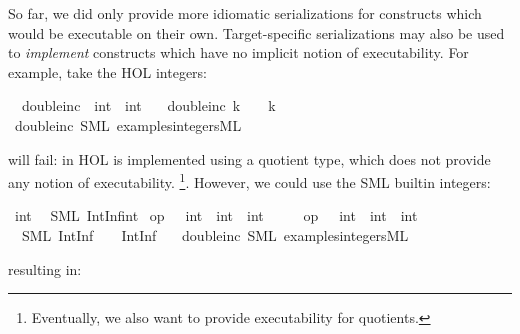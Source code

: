 \begin{isabellebody}
\begin{isamarkuptext}
  So far, we did only provide more idiomatic serializations for
  constructs which would be executable on their own.  Target-specific
  serializations may also be used to \emph{implement} constructs
  which have no implicit notion of executability.  For example,
  take the HOL integers:%
\end{isamarkuptext}%
\isamarkuptrue%
\isamarkupfalse%
\isanewline
\ \ double{\isacharunderscore}inc\ {\isacharcolon}{\isacharcolon}\ {\isachardoublequoteopen}int\ {\isasymRightarrow}\ int{\isachardoublequoteclose}\ \isanewline
\ \ {\isachardoublequoteopen}double{\isacharunderscore}inc\ k\ {\isacharequal}\ {}\ {\isacharasterisk}\ k\ {\isacharplus}\ {}{\isachardoublequoteclose}\isanewline
\isanewline
{}\isamarkupfalse%
\ double{\isacharunderscore}inc\ {\isacharparenleft}SML\ {\isachardoublequoteopen}examples{\isacharslash}integers{\isachardot}ML{\isachardoublequoteclose}{\isacharparenright}%
\begin{isamarkuptext}%
will fail:  in HOL is implemented using a quotient
  type, which does not provide any notion of executability.
  \footnote{Eventually, we also want to provide executability
  for quotients.}.  However, we could use the SML builtin
  integers:%
\end{isamarkuptext}%
\isamarkuptrue%
%
\isadelimtt
%
\endisadelimtt
%
\isatagtt
{}\isamarkupfalse%
\ int\isanewline
\ \ {\isacharparenleft}SML\ {\isachardoublequoteopen}IntInf{\isachardot}int{\isachardoublequoteclose}{\isacharparenright}\isanewline
\isanewline
{}\isamarkupfalse%
\ {\isachardoublequoteopen}op\ {\isacharplus}\ {\isasymColon}\ int\ {\isasymRightarrow}\ int\ {\isasymRightarrow}\ int{\isachardoublequoteclose}\isanewline
\ \ \ \ \ {\isachardoublequoteopen}op\ {\isacharasterisk}\ {\isasymColon}\ int\ {\isasymRightarrow}\ int\ {\isasymRightarrow}\ int{\isachardoublequoteclose}\isanewline
\ \ {\isacharparenleft}SML\ {\isachardoublequoteopen}IntInf{\isachardot}{\isacharplus}\ {\isacharparenleft}{\isacharunderscore}{\isacharcomma}\ {\isacharunderscore}{\isacharparenright}{\isachardoublequoteclose}\ \ {\isachardoublequoteopen}IntInf{\isachardot}{\isacharasterisk}\ {\isacharparenleft}{\isacharunderscore}{\isacharcomma}\ {\isacharunderscore}{\isacharparenright}{\isachardoublequoteclose}{\isacharparenright}%
\endisatagtt
{\isafoldtt}%
%
\isadelimtt
%
\endisadelimtt
\isanewline
\isanewline
{}\isamarkupfalse%
\ double{\isacharunderscore}inc\ {\isacharparenleft}SML\ {\isachardoublequoteopen}examples{\isacharslash}integers{\isachardot}ML{\isachardoublequoteclose}{\isacharparenright}%
\begin{isamarkuptext}%
resulting in:


\end{isamarkuptext}
\end{isabellebody}
